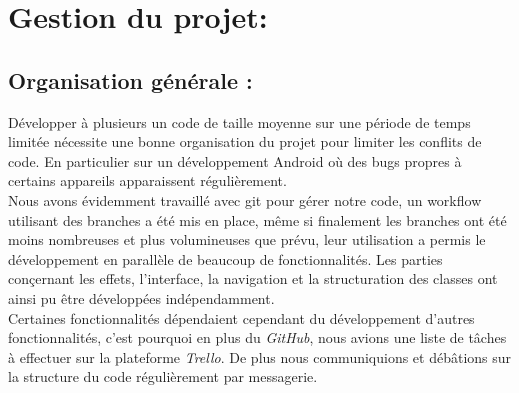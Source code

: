 \section{Gestion du projet:}

\subsection{Organisation générale :}
Développer à plusieurs un code de taille moyenne sur une période de temps limitée nécessite une bonne organisation du projet pour limiter les conflits de code. En particulier sur un développement Android où des bugs propres à certains appareils apparaissent régulièrement.
\\

Nous avons évidemment travaillé avec git pour gérer notre code, un workflow utilisant des branches a été mis en place, même si finalement les branches ont été moins nombreuses et plus volumineuses que prévu, leur utilisation a permis le développement en parallèle de beaucoup de fonctionnalités. Les parties conçernant les effets, l'interface, la navigation et la structuration des classes ont ainsi pu être développées indépendamment.
\\

Certaines fonctionnalités dépendaient cependant du développement d'autres fonctionnalités, c'est pourquoi en plus du \textit{GitHub}, nous avions une liste de tâches à effectuer sur la plateforme \textit{Trello}. De plus nous communiquions et débâtions sur la structure du code régulièrement par messagerie.